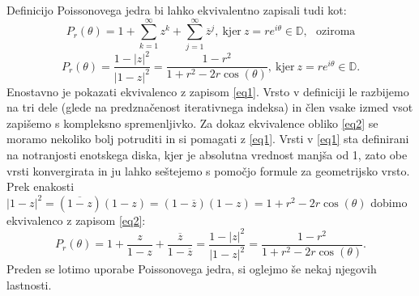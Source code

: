 \documentclass[mat1]{fmfdelo}
\begin{document}
    Definicijo Poissonovega jedra bi lahko ekvivalentno zapisali tudi kot:
        \begin{equation}
            \label{eq1}
            P_r(\theta) = 1 + \sum_{k=1}^{\infty}{z^k} + \sum_{j=1}^{\infty}{\overline{z}^{j}},~\text{kjer}~z = r e^{i\theta} \in \mathbb{D},~~~\text{oziroma}
        \end{equation}
        \begin{equation}
            \label{eq2}
            P_r(\theta) = \frac{1 - |z|^2}{|1-z|^2} = \frac{1-r^2}{1+ r^2 - 2r \cos(\theta)},~\text{kjer}~z= re^{i\theta} \in \mathbb{D}.
        \end{equation}
    Enostavno je pokazati ekvivalenco z zapisom \ref{eq1}. Vrsto v definiciji le razbijemo na tri dele (glede na predznačenost iterativnega indeksa) in člen vsake izmed vsot zapišemo s kompleksno spremenljivko. 
    Za dokaz ekvivalence obliko \ref{eq2} se moramo nekoliko bolj potruditi in si pomagati z \ref{eq1}. Vrsti v \ref{eq1} sta definirani na notranjosti enotskega diska, kjer je absolutna vrednost manjša od 1, zato obe vrsti konvergirata in ju lahko seštejemo s pomočjo formule za geometrijsko vrsto. 
    Prek enakosti $|1 - z|^2 = (\overline{1 - z})(1 - z) = (1 - \overline{z})(1 - z) = 1 + r^2 - 2r \cos(\theta)$ dobimo ekvivalenco z zapisom \ref{eq2}:
    $$
        P_r(\theta) = 1 + \frac{z}{1 - z} + \frac{\overline{z}}{1 - \overline{z}} = \frac{1 - |z|^2}{|1 - z|^2} = \frac{1 - r^2}{1 + r^2 - 2r\cos(\theta)}.
    $$
    Preden se lotimo uporabe Poissonovega jedra, si oglejmo še nekaj njegovih lastnosti. 
    
\end{document}
